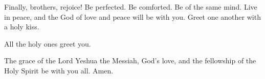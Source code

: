 \myverse{}Finally, brothers, rejoice! Be perfected. Be comforted. Be of
the same mind. Live in peace, and the God of love and peace will be with you.
\myverse{}Greet one another with a holy kiss.

\myverse{}All the holy ones greet you.

\myverse{}The grace of the Lord Yeshua the Messiah, God’s love, and the
fellowship of the Holy Spirit be with you all. Amen.




